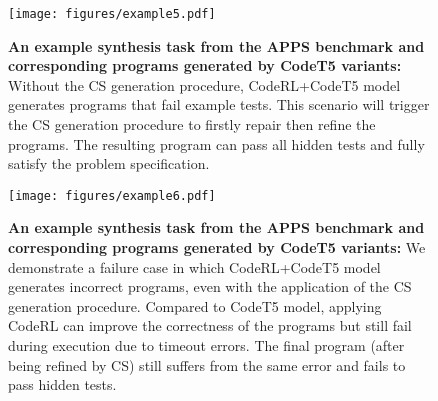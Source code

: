 \documentclass{article}
\begin{document}
\begin{figure}[htbp]
	\centering
	\resizebox{1.0\textwidth}{!} {
	\texttt{[image: figures/example5.pdf]}
	}
	\caption{
	\textbf{An example synthesis task from the APPS benchmark and corresponding programs generated by CodeT5 variants:}
	Without the CS generation procedure, CodeRL+CodeT5 model generates programs that fail example tests. 
	This scenario will trigger the CS generation procedure to firstly repair then refine the programs. 
	The resulting program can pass all hidden tests and fully satisfy the problem specification. 
	}
	\label{app_fig:example_program5}
\end{figure}



\begin{figure}[htbp]
	\centering
	\resizebox{1.0\textwidth}{!} {
	\texttt{[image: figures/example6.pdf]}
	}
	\caption{
	\textbf{An example synthesis task from the APPS benchmark and corresponding programs generated by CodeT5 variants:}
	We demonstrate a failure case in which CodeRL+CodeT5 model generates incorrect programs, even with the application of the CS generation procedure. 
	Compared to CodeT5 model, applying CodeRL can improve the correctness of the programs but still fail during execution due to timeout errors. 
	The final program (after being refined by CS) still suffers from the same error and fails to pass hidden tests. 
	}
	\label{app_fig:example_program6}
\end{figure} 
\end{document}
